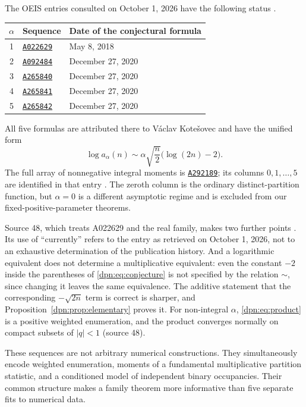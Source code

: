 \documentclass[11pt]{article}
\numberwithin{equation}{section}
\theoremstyle{definition}\newtheorem{definition}[theorem]{Definition}
\theoremstyle{remark}\newtheorem{remark}[theorem]{Remark}
\newcommand{\OEIS}[1]{\href{https://oeis.org/#1}{\texttt{#1}}}
\newcommand{\src}[1]{\textup{(source #1)}}
\begin{document}
The OEIS entries consulted on October 1, 2026 have the following status
\cite{oeis1,oeis2,oeis3,oeis4,oeis5}.
\begin{center}
\begin{tabular}{cll}
\toprule
$\alpha$ & Sequence & Date of the conjectural formula\\
\midrule
1 & \OEIS{A022629} & May 8, 2018\\
2 & \OEIS{A092484} & December 27, 2020\\
3 & \OEIS{A265840} & December 27, 2020\\
4 & \OEIS{A265841} & December 27, 2020\\
5 & \OEIS{A265842} & December 27, 2020\\
\bottomrule
\end{tabular}
\end{center}
All five formulas are attributed there to V\'aclav Kote\v{s}ovec and have the
unified form
\begin{equation}\label{dpn:eq:conjecture}
 \log a_\alpha(n)\sim
 \alpha\sqrt{\frac n2}\bigl(\log(2n)-2\bigr).
\end{equation}
The full array of nonnegative integral moments is \OEIS{A292189}; its columns
$0,1,\ldots,5$ are identified in that entry \cite{oeisarray}. The zeroth column
is the ordinary distinct-partition function, but $\alpha=0$ is a different
asymptotic regime and is excluded from our fixed-positive-parameter theorems.

Source 48, which treats A022629 and the real family, makes two further points
\cite{oeis1}.  Its use of ``currently'' refers to the entry as retrieved on
October 1, 2026, not to an exhaustive determination of the publication
history.  And a logarithmic equivalent does not determine a multiplicative
equivalent: even the constant $-2$ inside the parentheses of
\eqref{dpn:eq:conjecture} is not specified by the relation $\sim$, since
changing it leaves the same equivalence.  The additive statement that the
corresponding $-\sqrt{2n}$ term is correct is sharper, and
Proposition~\ref{dpn:prop:elementary} proves it.  For non-integral $\alpha$,
\eqref{dpn:eq:product} is a positive weighted enumeration, and the product
converges normally on compact subsets of $|q|<1$ \src{48}.

These sequences are not arbitrary numerical constructions. They simultaneously
encode weighted enumeration, moments of a fundamental multiplicative partition
statistic, and a conditioned model of independent binary occupancies. Their
common structure makes a family theorem more informative than five separate
fits to numerical data.
\end{document}

